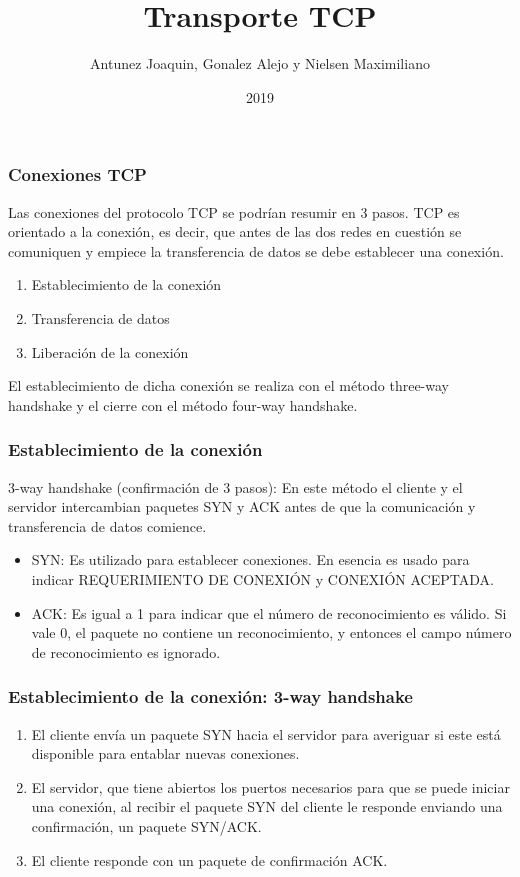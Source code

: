 \documentclass{beamer}
\title{Transporte TCP}
\author{Antunez Joaquin, Gonalez Alejo y Nielsen Maximiliano}
\institute{Instituto Politécnico Superior Gral. San Martín}
\date{2019}
\begin{document}
 
\frame{\titlepage}
 
\begin{frame}
\frametitle{Conexiones TCP}
Las conexiones del protocolo TCP se podrían resumir en 3 pasos.
TCP es orientado a la conexión, es decir, que antes de las dos redes en cuestión se comuniquen y empiece la transferencia de datos se debe establecer una conexión.
\vspace{5mm}
\begin{enumerate}
\item Establecimiento de la conexión
\item Transferencia de datos
\item Liberación de la conexión
\end{enumerate}

\vspace{5mm}

El establecimiento de dicha conexión se realiza con el método three-way handshake y el cierre con el método four-way handshake.

\end{frame}

\begin{frame}
\frametitle{Establecimiento de la conexión}
3-way handshake (confirmación de 3 pasos): En este método el cliente y el servidor intercambian paquetes SYN y ACK antes de que la comunicación y transferencia de datos comience.
\vspace{5mm}
\begin{itemize}
\item SYN: Es utilizado para establecer conexiones. En esencia es usado para indicar REQUERIMIENTO DE CONEXIÓN y CONEXIÓN ACEPTADA.
\item ACK: Es igual a 1 para indicar que el número de reconocimiento es válido. Si vale 0, el paquete no contiene un reconocimiento, y entonces el campo número de reconocimiento es ignorado.
\end{itemize}
\end{frame}

\begin{frame}
\frametitle{Establecimiento de la conexión: 3-way handshake}
\begin{enumerate}
\item El cliente envía un paquete SYN hacia el servidor para averiguar si este está disponible para entablar nuevas conexiones.
\item El servidor, que tiene abiertos los puertos necesarios para que se puede iniciar una conexión, al recibir el paquete SYN del cliente le responde enviando una confirmación, un paquete SYN/ACK.
\item El cliente responde con un paquete de confirmación ACK.
\end{enumerate}
\end{frame}
\end{document}
